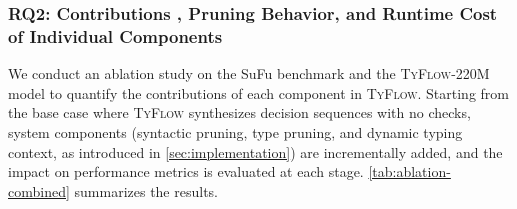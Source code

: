 \documentclass[manuscript,screen]{acmart}
\newcommand{\toolname}[1]{\textsc{#1}}
\newcommand{\mainname}{\toolname{TyFlow}\xspace}
\begin{document}

 \subsubsection{RQ2: Contributions {\color{revblue}, Pruning Behavior, and Runtime Cost } of Individual Components %
 }
   {\color{revblue}We } conduct an ablation study on the SuFu benchmark and the \mainname-220M model to quantify the contributions of each component in \mainname. Starting from the base case where \mainname synthesizes decision sequences with no checks, system components (syntactic pruning, type pruning, and dynamic typing context, as introduced in \autoref{sec:implementation}) are incrementally added, and the impact on performance metrics is evaluated at each stage. 
 \autoref{tab:ablation-combined} {\color{revblue}summarizes the results.
} 
\end{document}

